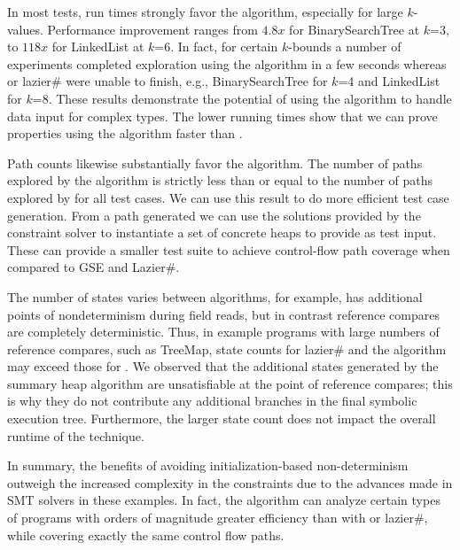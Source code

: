 In most tests, run times strongly favor the \symtxt{} algorithm, especially for
large $k$-values. Performance improvement ranges from $4.8x$ for
BinarySearchTree at $k$=3, to $118x$ for LinkedList at $k$=6. In fact,
for certain $k$-bounds a number of experiments completed exploration
using the \symtxt{} algorithm in a few seconds whereas \gsetxt{} or lazier\# were
unable to finish, e.g., BinarySearchTree for $k$=4 and LinkedList for
$k$=8. These results demonstrate the potential of using the \symtxt{} algorithm 
to handle data input for complex types. The lower running times
show that we can prove properties using the \symtxt{} algorithm faster than
\gsetxt{}.


Path counts likewise substantially favor the \symtxt{} algorithm. The number of
paths explored by the algorithm is strictly less than or equal to the number
of paths explored by \gsetxt{} for all test cases. We can use this
result to do more efficient test case generation. From a path
generated we can use the solutions provided by the constraint solver
to instantiate a set of concrete heaps to provide as test input. These
can provide a smaller test suite to achieve control-flow path coverage when
compared to GSE and Lazier\#.



The number of states varies between algorithms, for example, \gsetxt{}
has additional points of nondeterminism during field reads, but in
contrast reference compares are completely deterministic. Thus, in
example programs with large numbers of reference compares, such as
TreeMap, state counts for lazier\# and the \symtxt{} algorithm may
exceed those for \gsetxt{}. We observed that the additional states
generated by the summary heap algorithm are unsatisfiable at the point
of reference compares; this is why they do not contribute any
additional branches in the final symbolic execution tree. Furthermore,
the larger state count does not impact the overall runtime of the
technique.




In summary, the benefits of avoiding
initialization-based non-determinism outweigh the increased
complexity in the constraints due to the advances made in SMT
solvers in these examples. In fact, the \symtxt{} algorithm can analyze certain types of programs with
orders of magnitude greater efficiency than with \gsetxt{} or
lazier\#, while covering exactly the same control flow paths. 
